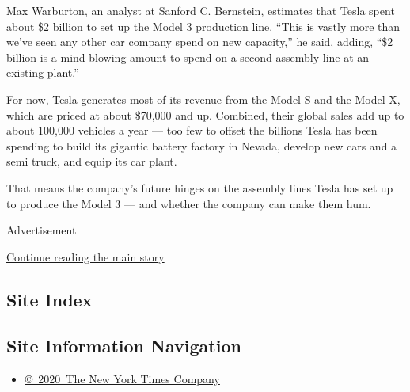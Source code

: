 Max Warburton, an analyst at Sanford C. Bernstein, estimates that Tesla
spent about \$2 billion to set up the Model 3 production line. ``This is
vastly more than we've seen any other car company spend on new
capacity,'' he said, adding, ``\$2 billion is a mind-blowing amount to
spend on a second assembly line at an existing plant.''

For now, Tesla generates most of its revenue from the Model S and the
Model X, which are priced at about \$70,000 and up. Combined, their
global sales add up to about 100,000 vehicles a year --- too few to
offset the billions Tesla has been spending to build its gigantic
battery factory in Nevada, develop new cars and a semi truck, and equip
its car plant.

That means the company's future hinges on the assembly lines Tesla has
set up to produce the Model 3 --- and whether the company can make them
hum.

Advertisement

\protect\hyperlink{after-bottom}{Continue reading the main story}

\hypertarget{site-index}{%
\subsection{Site Index}\label{site-index}}

\hypertarget{site-information-navigation}{%
\subsection{Site Information
Navigation}\label{site-information-navigation}}

\begin{itemize}
\tightlist
\item
  \href{https://help.nytimes3xbfgragh.onion/hc/en-us/articles/115014792127-Copyright-notice}{©~2020~The
  New York Times Company}
\end{itemize}

